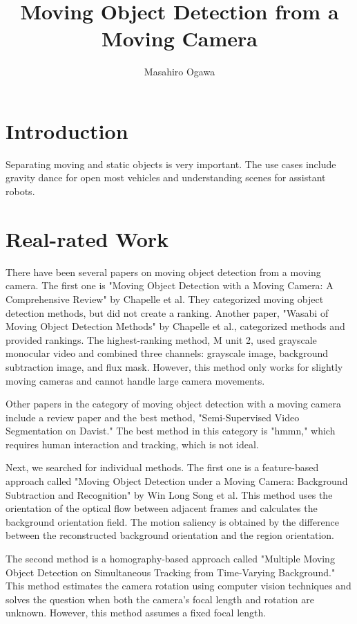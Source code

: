 \documentclass{article}
\title{Moving Object Detection from a Moving Camera}
\author{Masahiro Ogawa}
\begin{document}
\maketitle

\begin{multicols}{2}
\section{Introduction}
Separating moving and static objects is very important. The use cases include gravity dance for open most vehicles and understanding scenes for assistant robots.

\section{Real-rated Work}
There have been several papers on moving object detection from a moving camera. The first one is "Moving Object Detection with a Moving Camera: A Comprehensive Review" by Chapelle et al. They categorized moving object detection methods, but did not create a ranking. Another paper, "Wasabi of Moving Object Detection Methods" by Chapelle et al., categorized methods and provided rankings. The highest-ranking method, M unit 2, used grayscale monocular video and combined three channels: grayscale image, background subtraction image, and flux mask. However, this method only works for slightly moving cameras and cannot handle large camera movements.

Other papers in the category of moving object detection with a moving camera include a review paper and the best method, "Semi-Supervised Video Segmentation on Davist." The best method in this category is "hmmn," which requires human interaction and tracking, which is not ideal.

Next, we searched for individual methods. The first one is a feature-based approach called "Moving Object Detection under a Moving Camera: Background Subtraction and Recognition" by Win Long Song et al. This method uses the orientation of the optical flow between adjacent frames and calculates the background orientation field. The motion saliency is obtained by the difference between the reconstructed background orientation and the region orientation.

The second method is a homography-based approach called "Multiple Moving Object Detection on Simultaneous Tracking from Time-Varying Background." This method estimates the camera rotation using computer vision techniques and solves the question when both the camera's focal length and rotation are unknown. However, this method assumes a fixed focal length.


\end{multicols}
\end{document}
